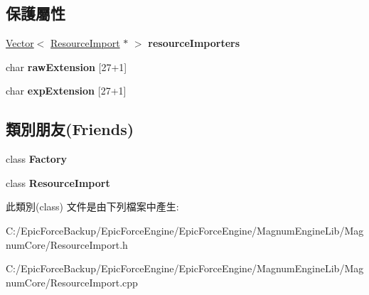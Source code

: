 \subsection*{保護屬性}
\begin{DoxyCompactItemize}
\item 
\hyperlink{class_magnum_1_1_vector}{Vector}$<$ \hyperlink{class_magnum_1_1_resource_import}{Resource\+Import} $\ast$ $>$ {\bfseries resource\+Importers}\hypertarget{class_magnum_1_1_resource_import_1_1_i_creator_a14d0e5bc72b0d62f3fe7ef17f59b9b9b}{}\label{class_magnum_1_1_resource_import_1_1_i_creator_a14d0e5bc72b0d62f3fe7ef17f59b9b9b}

\item 
char {\bfseries raw\+Extension} \mbox{[}27+1\mbox{]}\hypertarget{class_magnum_1_1_resource_import_1_1_i_creator_a26a52ae377306cacb18e10d3469fe384}{}\label{class_magnum_1_1_resource_import_1_1_i_creator_a26a52ae377306cacb18e10d3469fe384}

\item 
char {\bfseries exp\+Extension} \mbox{[}27+1\mbox{]}\hypertarget{class_magnum_1_1_resource_import_1_1_i_creator_ab6d09f6bcf4526601bd4f574913b1552}{}\label{class_magnum_1_1_resource_import_1_1_i_creator_ab6d09f6bcf4526601bd4f574913b1552}

\end{DoxyCompactItemize}
\subsection*{類別朋友(Friends)}
\begin{DoxyCompactItemize}
\item 
class {\bfseries Factory}\hypertarget{class_magnum_1_1_resource_import_1_1_i_creator_a328c093d609680cca505905c6d49901a}{}\label{class_magnum_1_1_resource_import_1_1_i_creator_a328c093d609680cca505905c6d49901a}

\item 
class {\bfseries Resource\+Import}\hypertarget{class_magnum_1_1_resource_import_1_1_i_creator_a886ab3c64485d3e65d51d9b87a500080}{}\label{class_magnum_1_1_resource_import_1_1_i_creator_a886ab3c64485d3e65d51d9b87a500080}

\end{DoxyCompactItemize}


此類別(class) 文件是由下列檔案中產生\+:\begin{DoxyCompactItemize}
\item 
C\+:/\+Epic\+Force\+Backup/\+Epic\+Force\+Engine/\+Epic\+Force\+Engine/\+Magnum\+Engine\+Lib/\+Magnum\+Core/Resource\+Import.\+h\item 
C\+:/\+Epic\+Force\+Backup/\+Epic\+Force\+Engine/\+Epic\+Force\+Engine/\+Magnum\+Engine\+Lib/\+Magnum\+Core/Resource\+Import.\+cpp\end{DoxyCompactItemize}
